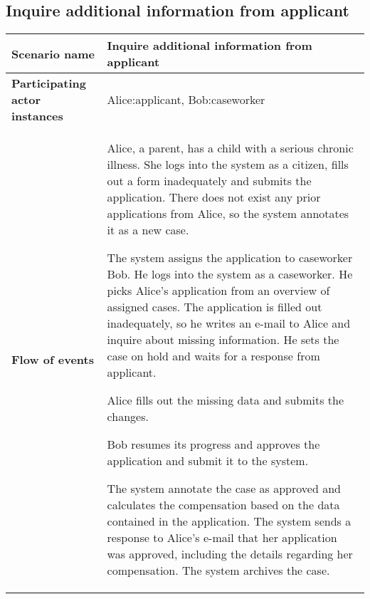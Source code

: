 \subsection*{Inquire additional information from applicant}
\begin{table}[htb!]
\begin{tabularx}{\textwidth}{l|X}
	\textbf{Scenario name} & Inquire additional information from applicant \\
	\hline
	\textbf{Participating actor instances} & Alice:applicant, Bob:caseworker\\
	\hline
	\textbf{Flow of events} &
	\begin{compactenum}
	        \item Alice, a parent, has a child with a serious chronic illness. She logs into the system as a citizen, fills out a form inadequately and submits the application. There does not exist any prior applications from Alice, so the system annotates it as a new case.
	        \item The system assigns the application to caseworker Bob. He logs into the system as a caseworker. He picks Alice's application from an overview of assigned cases. The application is filled out inadequately, so he writes an e-mail to Alice and inquire about missing information. He sets the case on hold and waits for a response from applicant.
	        \item Alice fills out the missing data and submits the changes. 
	        \item Bob resumes its progress and approves the application and submit it to the system.
	        \item The system annotate the case as approved and calculates the compensation based on the data contained in the application. The system sends a response to Alice's e-mail that her application was approved, including the details regarding her compensation. The system archives the case.
	\end{compactenum}\\
	\hline
\end{tabularx}
\end{table}

\newpage
